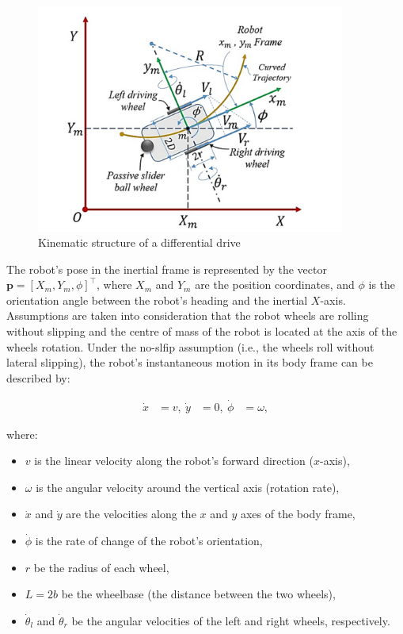 \begin{figure}[H]
    \centering
    \includegraphics[width=4.0in]{pics/x_y.png}
    \caption[Kinematic structure of a differential drive]{Kinematic structure of a differential drive~\cite{azevedo2018lidar}}
\end{figure} 


\noindent The robot's pose in the inertial frame is represented by the vector $\mathbf{p} = [X_m, Y_m, \phi]^\top$, where $X_m$ and
$Y_m$ are the position coordinates, and $\phi$ is the orientation angle between the robot's heading and the inertial $X$-axis. Assumptions are taken into consideration that the robot wheels are rolling without slipping and the centre of mass of the robot is
located at the axis of the wheels rotation. Under the no-slfip assumption (i.e., the wheels roll without lateral slipping), the
robot's instantaneous motion in its body frame can be described by:

\vspace{-0.25em}

\begin{equation} \begin{aligned} \dot{x} &= v, \ \dot{y} &= 0, \ \dot{\phi} &= \omega, \end{aligned} \end{equation}

where:

\begin{itemize}
    \setlength\itemsep{-0.5em}
    \item $v$ is the linear velocity along the robot's forward direction ($x$-axis),
    \item $\omega$ is the angular velocity around the vertical axis (rotation rate),
    \item $\dot{x}$ and $\dot{y}$ are the velocities along the $x$ and $y$ axes of the body frame,
    \item $\dot{\phi}$ is the rate of change of the robot's orientation,
    \item \( r \) be the radius of each wheel,
    \item \( L = 2b \) be the wheelbase (the distance between the two wheels),
    \item \( \dot{\theta}_l \) and \( \dot{\theta}_r \) be the angular velocities of the left and right wheels, respectively.
\end{itemize}


